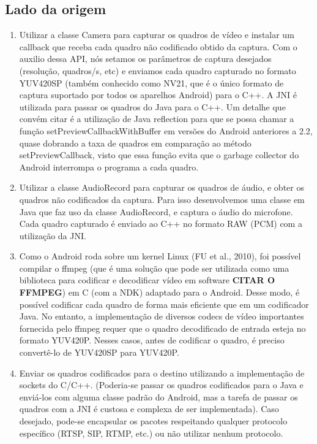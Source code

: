 \documentclass{acm_proc_article-sp}
\newcommand{\todo}[1]{\textcolor[rgb]{1.00,0.00,0.00}{\bf \uppercase{#1}}}
\begin{document}
\subsection{Lado da origem}
\begin{enumerate}
 \item Utilizar a classe Camera para capturar os quadros de vídeo e instalar um callback que receba cada quadro não codificado obtido da captura. Com o auxilio dessa API, nós setamos os parâmetros de captura desejados (resolução, quadros/s, etc) e enviamos cada quadro capturado no formato YUV420SP (também conhecido como NV21, que é o único formato de captura suportado por todos os aparelhos Android) para o C++. A JNI é utilizada para passar os quadros do Java para o C++.
Um detalhe que convém citar é a utilização de Java reflection para que se possa chamar a função setPreviewCallbackWithBuffer em versões do Android anteriores a 2.2, quase dobrando a taxa de quadros em comparação ao método setPreviewCallback, visto que essa função evita que o garbage collector do Android interrompa o programa a cada quadro.
 \item Utilizar a classe AudioRecord para capturar os quadros de áudio, e obter os quadros não codificados da captura. Para isso desenvolvemos uma classe em Java que faz uso da classe AudioRecord, e captura o áudio do microfone. Cada quadro capturado é enviado ao C++ no formato RAW (PCM) com a utilização da JNI.
 \item Como o Android roda sobre um kernel Linux (FU et al., 2010), foi possível compilar o ffmpeg (que é uma solução que pode ser utilizada como uma biblioteca para codificar e decodificar vídeo em software \todo{citar o ffmpeg}) em C (com a NDK) adaptado para o Android. Desse modo, é possível codificar cada quadro de forma mais eficiente que em um codificador Java. No entanto, a implementação de diversos codecs de vídeo importantes fornecida pelo ffmpeg requer que o quadro decodificado de entrada esteja no formato YUV420P. Nesses casos, antes de codificar o quadro, é preciso convertê-lo de YUV420SP para YUV420P.
 \item Enviar os quadros codificados para o destino utilizando a implementação de sockets do C/C++. (Poderia-se passar os quadros codificados para o Java e enviá-los com alguma classe padrão do Android, mas a tarefa de passar os quadros com a JNI é custosa e complexa de ser implementada). Caso desejado, pode-se encapsular os pacotes respeitando qualquer protocolo específico (RTSP, SIP, RTMP, etc.) ou não utilizar nenhum protocolo.
\end{enumerate}
\end{document}

